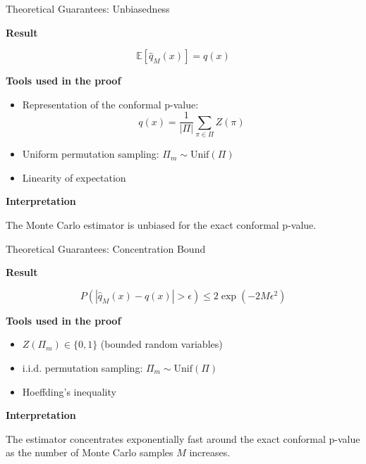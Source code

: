 \documentclass{beamer}					%
\begin{document}
\begin{frame}{Theoretical Guarantees: Unbiasedness}

\textbf{Result}

\[
\mathbb{E}[\hat{q}_M(x)] = q(x)
\]

\vspace{0.3cm}

\textbf{Tools used in the proof}

\begin{itemize}
\item Representation of the conformal p-value:
\[
q(x)=\frac{1}{|\Pi|}\sum_{\pi\in\Pi} Z(\pi)
\]
\item Uniform permutation sampling: \(\Pi_m \sim \text{Unif}(\Pi)\)
\item Linearity of expectation
\end{itemize}

\vspace{0.3cm}

\textbf{Interpretation}

The Monte Carlo estimator is unbiased for the exact conformal p-value.

\end{frame}

\begin{frame}{Theoretical Guarantees: Concentration Bound}

\textbf{Result}

\[
P\left(|\hat{q}_M(x)-q(x)|>\epsilon\right)
\le
2\exp(-2M\epsilon^2)
\]

\vspace{0.3cm}

\textbf{Tools used in the proof}

\begin{itemize}
\item \(Z(\Pi_m)\in\{0,1\}\) (bounded random variables)
\item i.i.d. permutation sampling: \(\Pi_m \sim \text{Unif}(\Pi)\)
\item Hoeffding's inequality
\end{itemize}

\vspace{0.3cm}

\textbf{Interpretation}

The estimator concentrates exponentially fast around the exact conformal p-value as the number of Monte Carlo samples \(M\) increases.

\end{frame}
\end{document}
